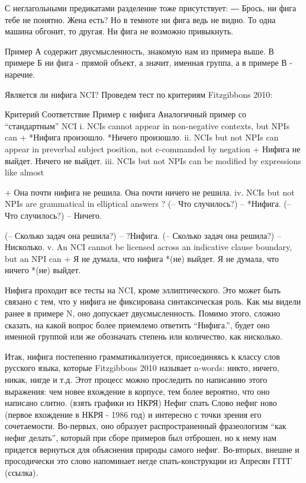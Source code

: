 \documentclass{article}
\begin{document}
С неглагольными предикатами разделение тоже присутствует:
 ― Брось, ни фига тебе не понятно. Жена есть?
Но в темноте ни фига ведь не видно. То одна машина обгонит, то другая. 
Ни фига не возможно привыкнуть.

Пример А содержит двусмысленность, знакомую нам из примера выше. В примере Б ни фига - прямой объект, а значит, именная группа, а в примере В - наречие.

Является ли нифига NCI? Проведем тест по критериям Fitzgibbons 2010:

Критерий
Соответствие
Пример с нифига
Аналогичный пример со “стандартным” NCI
 i. NCIs cannot appear in non-negative contexts, but NPIs can
+
*Нифига произошло.
*Ничего произошло.
ii. NCIs but not NPIs can appear in preverbal subject position, not c-commanded by negation
+
Нифига не выйдет.
Ничего не выйдет.
 iii. NCIs but not NPIs can be modified by expressions like almost


+
Она почти нифига не решила.
Она почти ничего не решила.
iv. NCIs but not NPIs are grammatical in elliptical answers
?
(-- Что случилось?)
-- *Нифига.
(-- Что случилось?)
-- Ничего.




(-- Сколько задач она решила?)
-- ?Нифига.
(-- Сколько задач она решила?)
-- Нисколько.
v. An NCI cannot be licensed across an indicative clause boundary, but an NPI can
+
Я не думала, что нифига *(не) выйдет.
Я не думала, что ничего *(не) выйдет.

Нифига проходит все тесты на NCI, кроме эллиптического. Это может быть связано с тем, что у нифига не фиксирована синтаксическая роль. Как мы видели ранее в примере N, оно допускает двусмысленность. Помимо этого, сложно сказать, на какой вопрос более приемлемо ответить “Нифига.”, будет оно именной группой или же обозначать степень или количество, как нисколько.

Итак, нифига постепенно грамматикализуется, присоединяясь к классу слов русского языка, которые Fitzgibbons 2010 называет n-words: никто, ничего, никак, нигде и т.д. Этот процесс можно проследить по написанию этого выражения: чем новее вхождение в корпусе, тем более вероятно, что оно написано слитно. (взять графики из НКРЯ)
Нефиг спать
Слово нефиг ново (первое вхождение в НКРЯ - 1986 год) и интересно с точки зрения его сочетаемости. Во-первых, оно образует распространенный фразеологизм “как нефиг делать”, который при сборе примеров был отброшен, но к нему нам придется вернуться для объяснения природы самого нефиг. Во-вторых, внешне и просодически это слово напоминает негде спать-конструкции из Апресян ГГГГ (ссылка).
\end{document}
